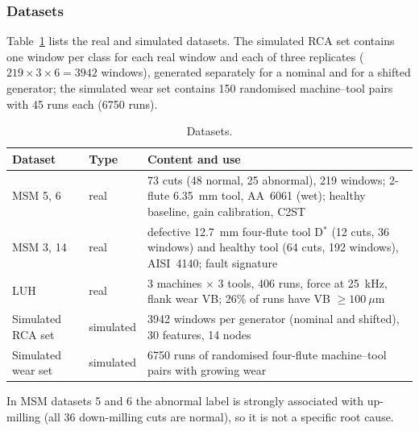 \documentclass[11pt]{article}
\begin{document}
\subsubsection{Datasets}
Table~\ref{tab:datasets} lists the real and simulated datasets. The simulated RCA set contains one window per class for each real window and each of three replicates ($219\times3\times6=3942$ windows), generated separately for a nominal and for a shifted generator; the simulated wear set contains 150 randomised machine--tool pairs with 45 runs each (6750 runs).
\begin{table}[t]\centering\small
\caption{Datasets.}\label{tab:datasets}
\begin{tabular}{p{3.0cm}p{2.0cm}p{9.2cm}}\toprule
Dataset & Type & Content and use\\\midrule
MSM 5, 6 \citep{kim2026msm} & real & 73 cuts (48 normal, 25 abnormal), 219 windows; 2-flute 6.35~mm tool, AA~6061 (wet); healthy baseline, gain calibration, C2ST\\
MSM 3, 14 & real & defective 12.7~mm four-flute tool D$^*$ (12 cuts, 36 windows) and healthy tool (64 cuts, 192 windows), AISI~4140; fault signature\\
LUH \citep{denkena2023luh} & real & 3 machines $\times$ 3 tools, 406 runs, force at 25~kHz, flank wear VB; 26\% of runs have VB $\ge100~\mu$m\\
Simulated RCA set & simulated & 3942 windows per generator (nominal and shifted), 30 features, 14 nodes\\
Simulated wear set & simulated & 6750 runs of randomised four-flute machine--tool pairs with growing wear\\\bottomrule
\end{tabular}
\end{table}
In MSM datasets 5 and 6 the abnormal label is strongly associated with up-milling (all 36 down-milling cuts are normal), so it is not a specific root cause.
\end{document}
